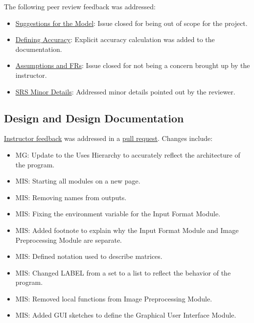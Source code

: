 \documentclass{article}
\begin{document}
\noindent The following peer review feedback was addressed:

\begin{itemize}
  \item \href{https://github.com/ptrandev/OCRacle/issues/8}{Suggestions for the Model}:
  Issue closed for being out of scope for the project.
  \item \href{https://github.com/ptrandev/OCRacle/issues/7}{Defining Accuracy}:
  Explicit accuracy calculation was added to the documentation.
  \item \href{https://github.com/ptrandev/OCRacle/issues/6}{Assumptions and FRs}:
  Issue closed for not being a concern brought up by the instructor.
  \item \href{https://github.com/ptrandev/OCRacle/issues/5}{SRS Minor Details}:
  Addressed minor details pointed out by the reviewer.
\end{itemize}


\subsection{Design and Design Documentation}

\href{https://github.com/ptrandev/OCRacle/issues/17}{Instructor feedback} was addressed in
a \href{https://github.com/ptrandev/OCRacle/pull/31}{pull request}. Changes include:

\begin{itemize}
  \item MG: Update to the Uses Hierarchy to accurately reflect the architecture of the program.
  \item MIS: Starting all modules on a new page.
  \item MIS: Removing names from outputs.
  \item MIS: Fixing the environment variable for the Input Format Module.
  \item MIS: Added footnote to explain why the Input Format Module and Image Preprocessing Module are separate.
  \item MIS: Defined notation used to describe matrices.
  \item MIS: Changed LABEL from a set to a list to reflect the behavior of the program.
  \item MIS: Removed local functions from Image Preprocessing Module.
  \item MIS: Added GUI sketches to define the Graphical User Interface Module.
\end{itemize}
\end{document}

